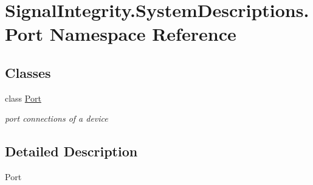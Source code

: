 \hypertarget{namespaceSignalIntegrity_1_1SystemDescriptions_1_1Port}{}\section{Signal\+Integrity.\+System\+Descriptions.\+Port Namespace Reference}
\label{namespaceSignalIntegrity_1_1SystemDescriptions_1_1Port}
\subsection*{Classes}
\begin{DoxyCompactItemize}
\item 
class \hyperlink{classSignalIntegrity_1_1SystemDescriptions_1_1Port_1_1Port}{Port}
\begin{DoxyCompactList}\small\item\em port connections of a device \end{DoxyCompactList}\end{DoxyCompactItemize}


\subsection{Detailed Description}
\begin{DoxyVerb}Port\end{DoxyVerb}
 